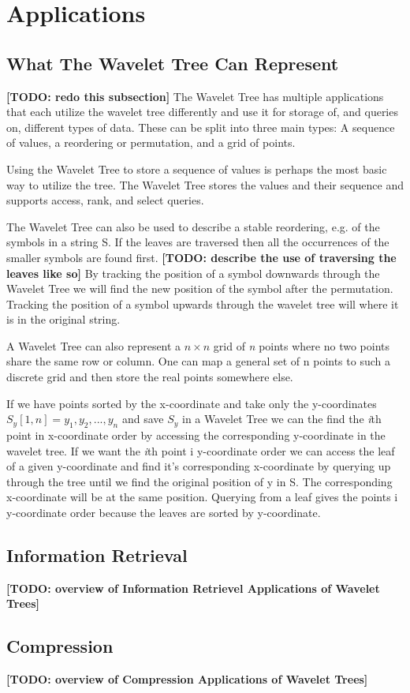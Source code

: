 \section{Applications}
\subsection{What The Wavelet Tree Can Represent}
\textbf{[TODO: redo this subsection]}
The Wavelet Tree has multiple applications that each utilize the wavelet tree differently and use it for storage of, and queries on, different types of data.
These can be split into three main types: A sequence of values, a reordering or permutation, and a grid of points.

Using the Wavelet Tree to store a sequence of values is perhaps the most basic way to utilize the tree.
The Wavelet Tree stores the values and their sequence and supports access, rank, and select queries.

The Wavelet Tree can also be used to describe a stable reordering, e.g. of the symbols in a string S. 
If the leaves are traversed then all the occurrences of the smaller symbols are found first. \textbf{[TODO: describe the use of traversing the leaves like so]}
By tracking the position of a symbol downwards through the Wavelet Tree we will find the new position of the symbol after the permutation.
Tracking the position of a symbol upwards through the wavelet tree will where it is in the original string. 

A Wavelet Tree can also represent a $n \times n$ grid of \textit{n} points where no two points share the same row or column. 
One can map a general set of n points to such a discrete grid and then store the real points somewhere else.

If we have points sorted by the x-coordinate and take only the y-coordinates $S_y[1,n] = y_1,y_2,...,y_n$ and save $S_y$ in a Wavelet Tree we can the find the \textit{i}th point in x-coordinate order by accessing the corresponding y-coordinate in the wavelet tree. 
If we want the \textit{i}th point i y-coordinate order we can access the leaf of a given y-coordinate and find it's corresponding x-coordinate by querying up through the tree until we find the original position of y in S. 
The corresponding x-coordinate will be at the same position.
Querying from a leaf gives the points i y-coordinate order because the leaves are sorted by y-coordinate.

\subsection{Information Retrieval}
\textbf{[TODO: overview of Information Retrievel Applications of Wavelet Trees]}

\subsection{Compression}
\textbf{[TODO: overview of Compression Applications of Wavelet Trees]}
